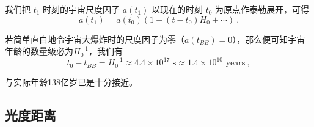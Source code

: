 我们把 $t_1$ 时刻的宇宙尺度因子 $a(t_1)$ 以现在的时刻 $t_0$ 为原点作泰勒展开，可得
\begin{equation}
a(t_1)=a(t_0)(1+(t-t_0)H_0+\cdots)~.
\end{equation}

若简单直白地令宇宙大爆炸时的尺度因子为零（$a(t_{BB})=0$），那么便可知宇宙年龄的数量级必为$H_0^{-1}$，我们有
\begin{equation}t_0-t_{BB}=H_0^{-1}\approx4.4\times10^{17}\text{ s}\approx1.4\times10^{10}\text{ years}~,\end{equation}

与实际年龄138亿岁已是十分接近。
\subsection{光度距离}
